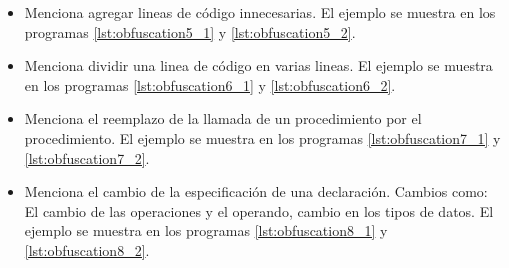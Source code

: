\begin{itemize}
    \item \cite{Grier1981} Menciona agregar lineas de código innecesarias. El ejemplo se muestra en los programas \ref{lst:obfuscation5_1} y \ref{lst:obfuscation5_2}.
    
    

    \item \cite{donaldson1981plagiarism} Menciona dividir una linea de código en varias lineas. El ejemplo se muestra en los programas \ref{lst:obfuscation6_1} y \ref{lst:obfuscation6_2}.
    
    

    \item \cite{WHALE1990131} Menciona el reemplazo de la llamada de un procedimiento por el procedimiento. El ejemplo se muestra en los programas \ref{lst:obfuscation7_1} y \ref{lst:obfuscation7_2}.
    
    

    \item \cite{WHALE1990131} Menciona el cambio de la especificación de una declaración. Cambios como: El cambio de las operaciones y el operando, cambio en los tipos de datos. El ejemplo se muestra en los programas \ref{lst:obfuscation8_1} y \ref{lst:obfuscation8_2}.
    
    


\end{itemize}
